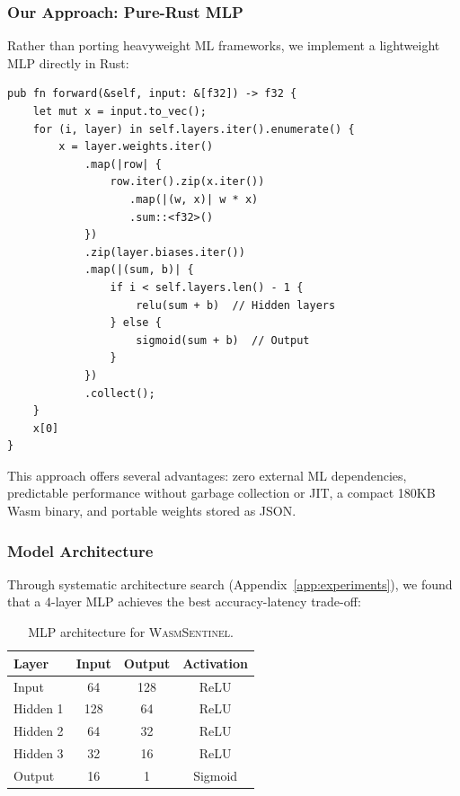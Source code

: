 \subsubsection{Our Approach: Pure-Rust MLP}

Rather than porting heavyweight ML frameworks, we implement a lightweight MLP directly in Rust:

\begin{lstlisting}[style=rust, caption={Core MLP inference loop in Rust.}]
pub fn forward(&self, input: &[f32]) -> f32 {
    let mut x = input.to_vec();
    for (i, layer) in self.layers.iter().enumerate() {
        x = layer.weights.iter()
            .map(|row| {
                row.iter().zip(x.iter())
                   .map(|(w, x)| w * x)
                   .sum::<f32>()
            })
            .zip(layer.biases.iter())
            .map(|(sum, b)| {
                if i < self.layers.len() - 1 {
                    relu(sum + b)  // Hidden layers
                } else {
                    sigmoid(sum + b)  // Output
                }
            })
            .collect();
    }
    x[0]
}
\end{lstlisting}

This approach offers several advantages: zero external ML dependencies, predictable performance without garbage collection or JIT, a compact 180KB Wasm binary, and portable weights stored as JSON.

\subsubsection{Model Architecture}

Through systematic architecture search (Appendix~\ref{app:experiments}), we found that a 4-layer MLP achieves the best accuracy-latency trade-off:

\begin{table}[t]
\centering
\caption{MLP architecture for \textsc{WasmSentinel}.}
\label{tab:mlp-arch}
\begin{tabular}{lccc}
\toprule
\textbf{Layer} & \textbf{Input} & \textbf{Output} & \textbf{Activation} \\
\midrule
Input & 64 & 128 & ReLU \\
Hidden 1 & 128 & 64 & ReLU \\
Hidden 2 & 64 & 32 & ReLU \\
Hidden 3 & 32 & 16 & ReLU \\
Output & 16 & 1 & Sigmoid \\
\bottomrule
\end{tabular}
\end{table}

